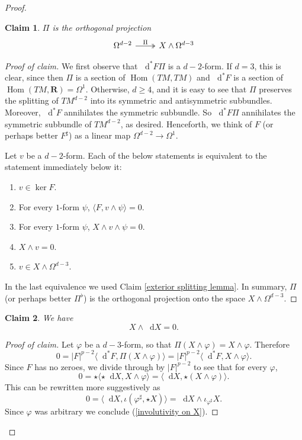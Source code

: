\documentclass[reqno,11pt]{amsart}
\newcommand{\RR}{\mathbf{R}}
\newcommand*\dif{\mathop{}\!\mathrm{d}}
\DeclareMathOperator{\Hom}{Hom}
\newtheorem{claim}{Claim}[theorem]
\theoremstyle{definition}
\numberwithin{equation}{section}
\begin{document}
\begin{proof}
\begin{claim}
$\Pi$ is the orthogonal projection
\[\begin{tikzcd}
	{\Omega^{d - 2}} & {X \wedge \Omega^{d - 3}}
	\arrow["\Pi", two heads, from=1-1, to=1-2]
\end{tikzcd}\]
\end{claim}
\begin{proof}[Proof of claim]
We first observe that $\dif^* F \Pi$ is a $d - 2$-form.
If $d = 3$, this is clear, since then $\Pi$ is a section of $\Hom(TM, TM)$ and $\dif^* F$ is a section of $\Hom(TM, \RR) = \Omega^1$.
Otherwise, $d \geq 4$, and it is easy to see that $\Pi$ preserves the splitting of $TM^{d - 2}$ into its symmetric and antisymmetric subbundles.
Moreover, $\dif^* F$ annihilates the symmetric subbundle.
So $\dif^* F \Pi$ annihilates the symmetric subbundle of $TM^{d - 2}$, as desired.
Henceforth, we think of $F$ (or perhaps better $F^\sharp$) as a linear map $\Omega^{d - 2} \to \Omega^1$.

Let $v$ be a $d - 2$-form.
Each of the below statements is equivalent to the statement immediately below it:
\begin{enumerate}
\item $v \in \ker F$.
\item For every $1$-form $\psi$, $\langle F, v \wedge \psi\rangle = 0$.
\item For every $1$-form $\psi$, $X \wedge v \wedge \psi = 0$.
\item $X \wedge v = 0$.
\item $v \in X \wedge \Omega^{d - 3}$.
\end{enumerate}
In the last equivalence we used Claim \ref{exterior splitting lemma}.
In summary, $\Pi$ (or perhaps better $\Pi^\flat$) is the orthogonal projection onto the space $X \wedge \Omega^{d - 3}$.
\end{proof}

\begin{claim}
We have
\begin{equation}\label{involutivity on X}
    X \wedge \dif X = 0.
\end{equation}
\end{claim}
\begin{proof}[Proof of claim]
Let $\varphi$ be a $d - 3$-form, so that $\Pi(X \wedge \varphi) = X \wedge \varphi$.
Therefore 
$$0 = |F|^{p - 2} \langle \dif^* F, \Pi(X \wedge \varphi)\rangle = |F|^{p - 2} \langle \dif^* F, X \wedge \varphi\rangle.$$
Since $F$ has no zeroes, we divide through by $|F|^{p - 2}$ to see that for every $\varphi$,
$$0 = \star \langle \star \dif X, X \wedge \varphi\rangle = \langle \dif X, \star(X \wedge \varphi)\rangle.$$
This can be rewritten more suggestively as 
$$0 = \langle \dif X, \iota(\varphi^\sharp, \star X)\rangle = \dif X \wedge \iota_{\varphi^\sharp} X.$$
Since $\varphi$ was arbitrary we conclude (\ref{involutivity on X}).
\end{proof}


\end{proof}
\end{document}
